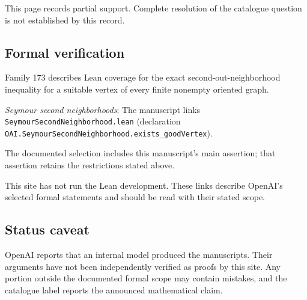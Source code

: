 \documentclass[11pt]{article}
\begin{document}
This page records partial support. Complete resolution of the catalogue question is not established by this record.

\subsection{Formal verification}
Family 173 describes Lean coverage for the exact second-out-neighborhood inequality for a suitable vertex of every finite nonempty oriented graph.

\textit{Seymour second neighborhoods}: The manuscript links \texttt{SeymourSecondNeighborhood.lean} (declaration \texttt{OAI.SeymourSecondNeighborhood.exists\_goodVertex}).

The documented selection includes this manuscript’s main assertion; that assertion retains the restrictions stated above.

This site has not run the Lean development. These links describe OpenAI’s selected formal statements and should be read with their stated scope.

\subsection{Status caveat}
OpenAI reports that an internal model produced the manuscripts. Their arguments have not been independently verified as proofs by this site. Any portion outside the documented formal scope may contain mistakes, and the catalogue label reports the announced mathematical claim.
\end{document}
